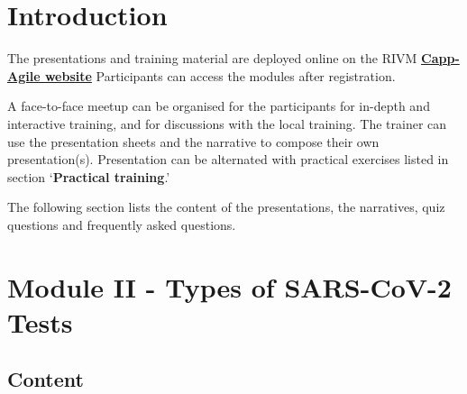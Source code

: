 \documentclass[
]{book}
\begin{document}
\hypertarget{introduction}{%
\section{Introduction}\label{introduction}}

The presentations and training material are deployed online on the RIVM
\textbf{\href{https://rivm-academie.cappagile.com/s/DcYnbt1tmyFU9GKQWUEHgg}{Capp-Agile website}}
Participants can access the modules after registration.

A face-to-face meetup can be organised for the participants for in-depth
and interactive training, and for discussions with the local training.
The trainer can use the presentation sheets and the narrative to compose
their own presentation(s). Presentation can be alternated with practical
exercises listed in section `\textbf{Practical training}.'

The following section lists the content of the presentations, the
narratives, quiz questions and frequently asked questions.

\hypertarget{M2}{%
\section{Module II - Types of SARS-CoV-2 Tests}\label{M2}}

\hypertarget{content}{%
\subsection{Content}\label{content}}
\end{document}
